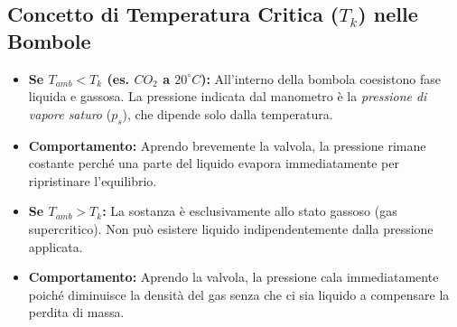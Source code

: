 






\subsection[Concetto di temperatura Critica nelle bombole]
{Concetto di Temperatura Critica ($T_k$) nelle Bombole}

\begin{itemize}
    \item \textbf{Se $T_{amb} < T_k$ (es. $CO_2$ a $20^\circ C$):} 
    All'interno della bombola coesistono fase liquida e gassosa. La pressione indicata dal manometro è la \textit{pressione di vapore saturo} ($p_s$), che dipende solo dalla temperatura.
    \item \textbf{Comportamento:} Aprendo brevemente la valvola, la pressione rimane costante perché una parte del liquido evapora immediatamente per ripristinare l'equilibrio.
    \medskip
    \item \textbf{Se $T_{amb} > T_k$:} 
    La sostanza è esclusivamente allo stato gassoso (gas supercritico). Non può esistere liquido indipendentemente dalla pressione applicata.
    \item \textbf{Comportamento:} Aprendo la valvola, la pressione cala immediatamente poiché diminuisce la densità del gas senza che ci sia liquido a compensare la perdita di massa.
\end{itemize}\smallbreak

